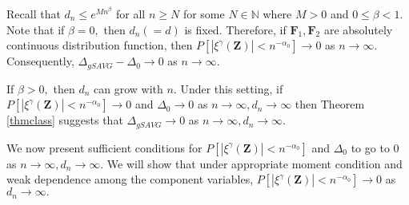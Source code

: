 \documentclass[twoside]{article}
\newcommand{\bZ}{\mathbf{Z}}
\newcommand{\bF}{\mathbf{F}}
\newcommand{\0}{\mathbf{0}}
\newcommand{\1}{\mathbf{1}}
\numberwithin{equation}{section}
\begin{document}
 Recall that $d_n \leq e^{Mn^\beta}$ for all $n\geq N$ for some $N\in\mathbb{N}$ where $M>0$ and $0\leq \beta<1.$ Note that if $\beta =0,$ then $d_n(=d)$ is fixed. Therefore, if $\bF_1,\bF_2$ are absolutely continuous distribution function, then $P[|\xi^\gamma(\bZ)|< n^{-\alpha_0}]\to 0$ as $n\to\infty.$ Consequently, $\Delta_{gSAVG} - \Delta_0\to 0$ as $n\to\infty.$\newline

 If $\beta >0,$ then $d_n$ can grow with $n$. Under this setting, if $P[|\xi^\gamma(\bZ)|< n^{-\alpha_0}]\to 0$ and $\Delta_0\to 0$ as $n\to\infty, d_n\to \infty$ then Theorem \ref{thmclass} suggests that $\Delta_{gSAVG}\to 0$ as $n\to\infty, d_n\to \infty$.\newline
    
\noindent We now present sufficient conditions for $P[|\xi^\gamma(\bZ)|< n^{-\alpha_0}]$ and $\Delta_0$ to go to 0 as $n\to\infty, d_n\to\infty.$ We will show that under appropriate moment condition and weak dependence among the component variables, $P[|\xi^\gamma(\bZ)|< n^{-\alpha_0}]\to 0$ as $d_n\to\infty.$\newline
\end{document}
